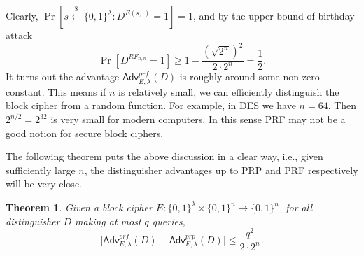 \documentclass[12pt]{article}
\newcommand{\bits}{\{0,1\}}
\newcommand{\getsr}{\stackrel{\$}{\gets}}
\newcommand{\Adv}{\mathsf{Adv}}
\newtheorem{theorem}{Theorem}[section]
\theoremstyle{definition}
\begin{document}
Clearly, $\Pr[s \getsr \bits^\lambda : D^{E(s, \cdot)} = 1] = 1$, and by the upper bound of birthday attack
$$\Pr[D^{RF_{n,n}}=1] \geq 1-\frac{(\sqrt{2^n})^2}{2\cdot 2^n} = \frac{1}{2}.$$
It turns out the advantage $\Adv_{E,\lambda}^{prf}(D)$ is roughly around some non-zero constant. This means if $n$ is relatively small, we can efficiently distinguish the block cipher from a random function. For example, in DES we have $n=64$. Then $2^{n/2} = 2^{32}$ is very small for modern computers. In this sense PRF may not be a good notion for secure block ciphers.

The following theorem puts the above discussion in a clear way, i.e., given sufficiently large $n$, the distinguisher advantages up to PRP and PRF respectively will be very close.
\begin{theorem}
Given a block cipher $E : \bits^\lambda \times \bits^n \mapsto \bits^n$, for all distinguisher $D$ making at most $q$ queries, 
$$\bigg| \Adv_{E,\lambda}^{prf}(D) - \Adv_{E,\lambda}^{prp}(D) \bigg| \leq \frac{q^2}{2 \cdot 2^n}.$$
\end{theorem}
\end{document}
